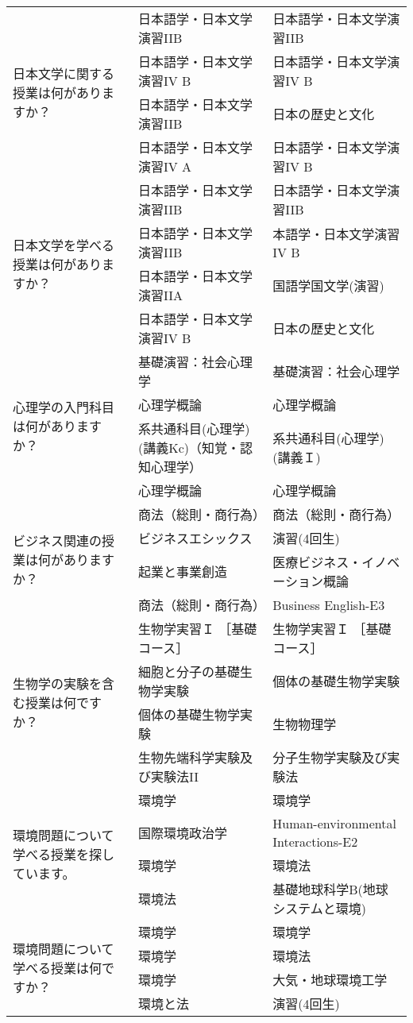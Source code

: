 \begin{table}[htbp]
{\begin{tabular}{|p{2.5cm}|p{5.5cm}|p{5.5cm}|}
        \multirow{4}{2.5cm}{日本文学に関する授業は何がありますか？} & 
        日本語学・日本文学演習IIB & 日本語学・日本文学演習IIB \\
        & 日本語学・日本文学演習IV B & 日本語学・日本文学演習IV B \\
        & 日本語学・日本文学演習IIB & 日本の歴史と文化 \\
        & 日本語学・日本文学演習IV A & 日本語学・日本文学演習IV B \\ \hline
        \multirow{4}{2.5cm}{日本文学を学べる授業は何がありますか？} & 
        日本語学・日本文学演習IIB & 日本語学・日本文学演習IIB \\
        & 日本語学・日本文学演習IIB & 本語学・日本文学演習IV B \\
        & 日本語学・日本文学演習IIA & 国語学国文学(演習) \\
        & 日本語学・日本文学演習IV B & 日本の歴史と文化 \\ \hline
        \multirow{4}{2.5cm}{心理学の入門科目は何がありますか？} & 
        基礎演習：社会心理学 & 基礎演習：社会心理学 \\
        & 心理学概論 & 心理学概論 \\
        & 系共通科目(心理学)(講義Kc)（知覚・認知心理学） & 系共通科目(心理学)(講義Ｉ) \\
        & 心理学概論 & 心理学概論 \\ \hline
        \multirow{4}{2.5cm}{ビジネス関連の授業は何がありますか？} & 
        商法（総則・商行為） & 商法（総則・商行為） \\
        & ビジネスエシックス & 演習(4回生) \\
        & 起業と事業創造 & 医療ビジネス・イノベーション概論 \\
        & 商法（総則・商行為） & Business English-E3 \\ \hline
        \multirow{4}{2.5cm}{生物学の実験を含む授業は何ですか？} & 
        生物学実習Ｉ ［基礎コース］ & 生物学実習Ｉ ［基礎コース］ \\
        & 細胞と分子の基礎生物学実験 & 個体の基礎生物学実験 \\
        & 個体の基礎生物学実験 & 生物物理学 \\
        & 生物先端科学実験及び実験法II & 分子生物学実験及び実験法 \\ \hline
        \multirow{4}{2.5cm}{環境問題について学べる授業を探しています。} & 
        環境学 & 環境学 \\
        & 国際環境政治学 & Human-environmental Interactions-E2 \\
        & 環境学 & 環境法 \\
        & 環境法 & 基礎地球科学B(地球システムと環境) \\ \hline
        \multirow{4}{2.5cm}{環境問題について学べる授業は何ですか？} & 
        環境学 & 環境学 \\
        & 環境学 & 環境法 \\
        & 環境学 & 大気・地球環境工学 \\
        & 環境と法 & 演習(4回生) \\ \hline
    \end{tabular}
    }
\end{table}


